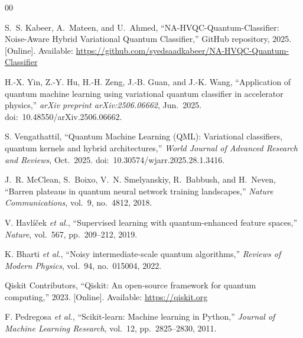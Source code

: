 \documentclass[conference]{IEEEtran}
\begin{document}
\begin{thebibliography}{00}

S.~S. Kabeer, A.~Mateen, and U.~Ahmed, ``NA-HVQC-Quantum-Classifier: Noise-Aware Hybrid Variational Quantum Classifier,'' GitHub repository, 2025. [Online]. Available: \url{https://github.com/syedsaadkabeer/NA-HVQC-Quantum-Classifier}

H.-X. Yin, Z.-Y. Hu, H.-H. Zeng, J.-B. Guan, and J.-K. Wang, ``Application of quantum machine learning using variational quantum classifier in accelerator physics,'' \textit{arXiv preprint arXiv:2506.06662}, Jun.~2025. doi:~10.48550/arXiv.2506.06662.

S. Vengathattil, ``Quantum Machine Learning (QML): Variational classifiers, quantum kernels and hybrid architectures,'' \textit{World Journal of Advanced Research and Reviews}, Oct.~2025. doi:~10.30574/wjarr.2025.28.1.3416.

J.~R. McClean, S.~Boixo, V.~N. Smelyanskiy, R.~Babbush, and H.~Neven, ``Barren plateaus in quantum neural network training landscapes,'' \textit{Nature Communications}, vol.~9, no.~4812, 2018.

V. Havl\'{i}\v{c}ek \textit{et al.}, ``Supervised learning with quantum-enhanced feature spaces,'' \textit{Nature}, vol.~567, pp.~209--212, 2019.

K. Bharti \textit{et al.}, ``Noisy intermediate-scale quantum algorithms,'' \textit{Reviews of Modern Physics}, vol.~94, no.~015004, 2022.

Qiskit Contributors, ``Qiskit: An open-source framework for quantum computing,'' 2023. [Online]. Available: \url{https://qiskit.org}

F. Pedregosa \textit{et al.}, ``Scikit-learn: Machine learning in Python,'' \textit{Journal of Machine Learning Research}, vol.~12, pp.~2825--2830, 2011.

\end{thebibliography}
\end{document}

